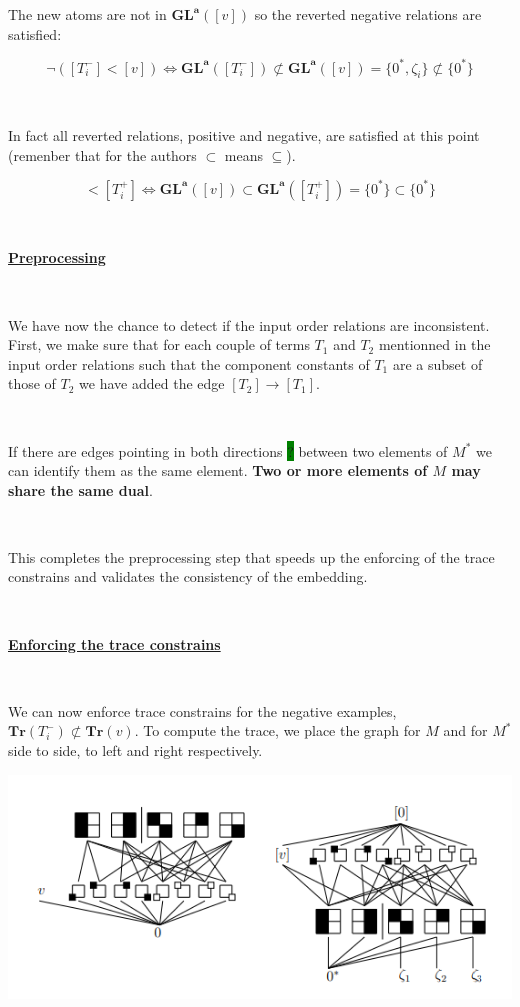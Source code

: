 \documentclass[a4paper, 11pt]{article}
\begin{document}
The new atoms are not in $\boldsymbol{GL}^{\boldsymbol{a}}([v])$ so the reverted negative relations are satisfied:

\begin{equation*}
    \neg([T_i^-] < [v]) \Leftrightarrow \boldsymbol{GL}^{\boldsymbol{a}}([T_i^-]) \not\subset \boldsymbol{GL}^{\boldsymbol{a}}([v]) = \{0^{\ast},\zeta_i \} \not\subset \{ 0^{\ast} \}
\end{equation*}

\

In fact all reverted relations, positive and negative, are satisfied at this point (remenber that for the authors $\subset$ means $\subseteq$).

\begin{equation*}
    [v] < [T_i^+] \Leftrightarrow \boldsymbol{GL}^{\boldsymbol{a}}([v]) \subset \boldsymbol{GL}^{\boldsymbol{a}}([T_i^+]) = \{0^{\ast}\} \subset \{ 0^{\ast} \}
\end{equation*}

\

\noindent
\textbf{\underline{Preprocessing}}

\

We have now the chance to detect if the input order relations are inconsistent. First, we make sure that for each couple of terms $T_1$ and $T_2$ mentionned in the input order relations such that the component constants of $T_1$ are a subset of those of $T_2$ we have added the edge $[T_2] \rightarrow [T_1]$.

\

If there are edges pointing in both directions \colorbox{green}{?} between two elements of $M^{\ast}$ we can identify them as the same element. \textbf{Two or more elements of $M$ may share the same dual}. 

\

This completes the preprocessing step that speeds up the enforcing of the trace constrains and validates the consistency of the embedding.

\

\noindent
\textbf{\underline{Enforcing the trace constrains}}

\

We can now enforce trace constrains for the negative examples, $\textbf{Tr}(T_i^-) \not\subset \textbf{Tr}(v)$. To compute the trace, we place the graph for $M$ and for $M^{\ast}$ side to side, to left and right respectively.

\begin{center}
    \includegraphics[scale = 0.7]{algorithm.png}
\end{center}
\end{document}
